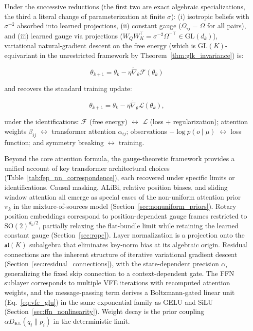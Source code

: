 \documentclass[twoside,11pt]{article}
\begin{document}
Under the successive reductions (the first two are exact algebraic specializations, the third a literal change of parameterization at finite $\sigma$): (i) isotropic beliefs with $\sigma^{-2}$ absorbed into learned projections, (ii) constant gauge ($\Omega_{ij} = \Omega$ for all pairs), and (iii) learned gauge via projections ($W_Q W_K^\top = \sigma^{-2}\Omega^{-\top} \in \mathrm{GL}(d_k)$), variational natural-gradient descent on the free energy (which is $\mathrm{GL}(K)$-equivariant in the unrestricted framework by Theorem~\ref{thm:glk_invariance}) is:

\begin{equation}
\theta_{k+1} = \theta_k - \eta \tilde{\nabla}_\theta \mathcal{F}(\theta_k)
\end{equation}

and recovers the standard training update:

\begin{equation}
\theta_{k+1} = \theta_k - \eta \tilde{\nabla}_\theta \mathcal{L}(\theta_k),
\end{equation}

under the identifications: $\mathcal{F}$ (free energy) $\leftrightarrow$ $\mathcal{L}$ (loss + regularization); attention weights $\beta_{ij}$ $\leftrightarrow$ transformer attention $\alpha_{ij}$; observations $-\log p(o \mid \mu)$ $\leftrightarrow$ loss function; and symmetry breaking $\leftrightarrow$ training.

Beyond the core attention formula, the gauge-theoretic framework provides a unified account of key transformer architectural choices (Table~\ref{tab:fep_nn_correspondence}), each recovered under specific limits or identifications. Causal masking, ALiBi, relative position biases, and sliding window attention all emerge as special cases of the non-uniform attention prior $\pi_k$ in the mixture-of-sources model (Section~\ref{sec:nonuniform_priors}). Rotary position embeddings correspond to position-dependent gauge frames restricted to $\mathrm{SO}(2)^{d_k/2}$, partially relaxing the flat-bundle limit while retaining the learned constant gauge (Section~\ref{sec:rope}). Layer normalization is a projection onto the $\mathfrak{sl}(K)$ subalgebra that eliminates key-norm bias at its algebraic origin. Residual connections are the inherent structure of iterative variational gradient descent (Section~\ref{sec:residual_connections}), with the state-dependent precision $\alpha_i$ generalizing the fixed skip connection to a context-dependent gate. The FFN sublayer corresponds to multiple VFE iterations with recomputed attention weights, and the message-passing term derives a Boltzmann-gated linear unit (Eq.~\ref{eq:vfe_glu}) in the same exponential family as GELU and SiLU (Section~\ref{sec:ffn_nonlinearity}). Weight decay is the prior coupling $\alpha D_{\mathrm{KL}}(q_i \| p_i)$ in the deterministic limit.
\end{document}
